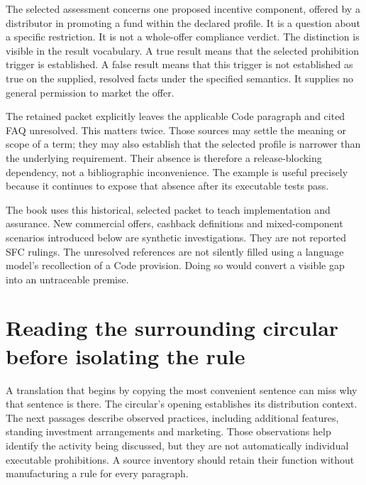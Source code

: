 
The selected assessment concerns one proposed incentive component, offered by a
distributor in promoting a fund within the declared profile. It is a question
about a specific restriction. It is not a whole-offer compliance verdict. The
distinction is visible in the result vocabulary. A true result means that the
selected prohibition trigger is established. A false result means that this
trigger is not established as true on the supplied, resolved facts under the
specified semantics. It supplies no general permission to market the offer.

The retained packet explicitly leaves the applicable Code paragraph and cited
FAQ unresolved. This matters twice. Those sources may settle the meaning or
scope of a term; they may also establish that the selected profile is narrower
than the underlying requirement. Their absence is therefore a release-blocking
dependency, not a bibliographic inconvenience. The example is useful precisely
because it continues to expose that absence after its executable tests pass.

The book uses this historical, selected packet to teach implementation and
assurance. New commercial offers, cashback definitions and mixed-component
scenarios introduced below are synthetic investigations. They are not reported
SFC rulings. The unresolved references are not silently filled using a language
model's recollection of a Code provision. Doing so would convert a visible gap
into an untraceable premise.

\section{Reading the surrounding circular before isolating the rule}
\label{merge:M02:01}

\label{sec:circular-context}
A translation that begins by copying the most convenient sentence can miss why
that sentence is there. The circular's opening establishes its distribution
context. The next passages describe observed practices, including additional
features, standing investment arrangements and marketing. Those observations
help identify the activity being discussed, but they are not automatically
individual executable prohibitions. A source inventory should retain their
function without manufacturing a rule for every paragraph.

